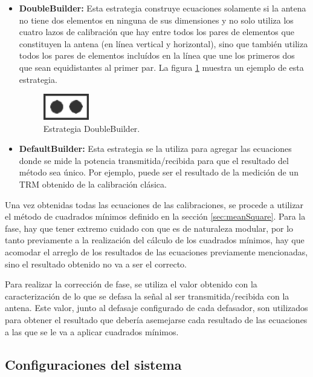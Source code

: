 \begin{itemize}
	\item \textbf{DoubleBuilder:} Esta estrategia construye ecuaciones solamente si la antena no tiene dos elementos en ninguna de 
		sus dimensiones y no solo utiliza los cuatro lazos de calibración que hay entre todos los pares de elementos que constituyen
		la antena (en línea vertical y horizontal), sino que también utiliza todos los pares de elementos incluídos en la línea que 
		une los primeros dos que sean equidistantes al primer par. La figura \ref{fig:doubleBuilder} muestra un ejemplo de esta estrategia.
		
		\begin{figure}[H]
		 \centering
		 \includegraphics[width=2cm]{gfx/FrontAntenna2.png}
		 \caption{Estrategia DoubleBuilder.}
		 \label{fig:doubleBuilder}
		\end{figure}

	\item \textbf{DefaultBuilder:} Esta estrategia se la utiliza para agregar las ecuaciones donde se mide la potencia 
		transmitida/recibida para que el resultado del método sea único. Por ejemplo, puede ser el resultado de la medición de un 
		TRM obtenido de la calibración clásica.
\end{itemize}


Una vez obtenidas todas las ecuaciones de las calibraciones, se procede a utilizar el método de cuadrados mínimos definido en 
la sección \ref{sec:meanSquare}. Para la fase, hay que tener extremo cuidado con que es de naturaleza modular, por lo tanto 
previamente a la realización del cálculo de los cuadrados mínimos, hay que acomodar el arreglo de los resultados de las 
ecuaciones previamente mencionadas, sino el resultado obtenido no va a ser el correcto.

Para realizar la corrección de fase, se utiliza el valor obtenido con la caracterización de lo que se defasa la señal al ser 
transmitida/recibida con la antena. Este valor, junto al defasaje configurado de cada defasador, son utilizados para obtener el
resultado que debería asemejarse cada resultado de las ecuaciones a las que se le va a aplicar cuadrados mínimos. 



\subsection{Configuraciones del sistema}

